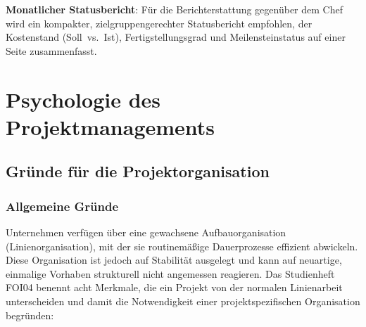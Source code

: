 \documentclass[
    a4paper,
    11pt,
    bibliography=totoc,
    listof=totoc,
    parskip=half,
    headings=normal
]{scrbook}
\begin{document}
\textbf{Monatlicher Statusbericht}: Für die Berichterstattung gegenüber dem Chef
wird ein kompakter, zielgruppengerechter Statusbericht empfohlen, der
Kostenstand (Soll~vs.~Ist), Fertigstellungsgrad und Meilensteinstatus auf einer
Seite zusammenfasst\autocite[vgl.][Kap.~3]{Mayer2014}.

\chapter{Psychologie des Projektmanagements}

\section{Gründe für die Projektorganisation}

\subsection{Allgemeine Gründe}

Unternehmen verfügen über eine gewachsene Aufbauorganisation (Linienorganisation),
mit der sie routinemäßige Dauerprozesse effizient abwickeln. Diese Organisation
ist jedoch auf Stabilität ausgelegt und kann auf neuartige, einmalige Vorhaben
strukturell nicht angemessen reagieren\autocite[vgl.][Kap.~1]{Kiefer2010}.
Das Studienheft FOI04 benennt acht Merkmale, die ein Projekt von der normalen
Linienarbeit unterscheiden und damit die Notwendigkeit einer projektspezifischen
Organisation begründen:
\end{document}
